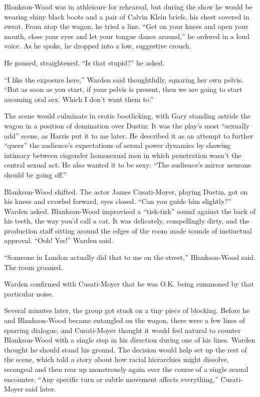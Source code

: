 Blankson-Wood was in athleisure for rehearsal, but during the show he
would be wearing shiny black boots and a pair of Calvin Klein briefs,
his chest covered in sweat. From atop the wagon, he tried a line. ``Get
on your knees and open your mouth, close your eyes and let your tongue
dance around,'' he ordered in a loud voice. As he spoke, he dropped into
a low, suggestive crouch.

He paused, straightened. ``Is that stupid?'' he asked.

``I like the exposure here,'' Warden said thoughtfully, squaring her own
pelvis. ``But as soon as you start, if your pelvis is present, then we
are going to start assuming oral sex. Which I don't want them to.''

The scene would culminate in erotic bootlicking, with Gary standing
astride the wagon in a position of domination over Dustin: It was the
play's most ``sexually odd'' scene, as Harris put it to me later. He
described it as an attempt to further ``queer'' the audience's
expectations of sexual power dynamics by showing intimacy between
cisgender homosexual men in which penetration wasn't the central sexual
act. He also wanted it to be sexy: ``The audience's mirror neurons
should be going off.''

Blankson-Wood shifted. The actor James Cusati-Moyer, playing Dustin, got
on his knees and crawled forward, eyes closed. ``Can you guide him
slightly?'' Warden asked. Blankson-Wood improvised a ``tisk-tisk'' sound
against the back of his teeth, the way you'd call a cat. It was
delicately, compellingly dirty, and the production staff sitting around
the edges of the room made sounds of instinctual approval. ``Ooh! Yes!''
Warden said.

``Someone in London actually did that to me on the street,''
Blankson-Wood said. The room groaned.

Warden confirmed with Cusati-Moyer that he was O.K. being summoned by
that particular noise.

Several minutes later, the group got stuck on a tiny piece of blocking.
Before he and Blankson-Wood became entangled on the wagon, there were a
few lines of sparring dialogue, and Cusati-Moyer thought it would feel
natural to counter Blankson-Wood with a single step in his direction
during one of his lines. Warden thought he should stand his ground. The
decision would help set up the rest of the scene, which told a story
about how racial hierarchies might dissolve, recongeal and then rear up
monstrously again over the course of a single sexual encounter. ``Any
specific turn or subtle movement affects everything,'' Cusati-Moyer said
later.

